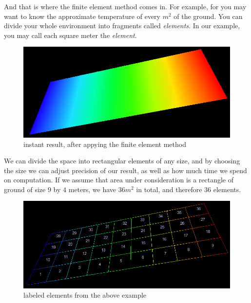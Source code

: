 \documentclass[a4paper,12pt]{article}
\begin{document}
\newpage

And that is where the finite element method comes in. For example, for you may want to know the approximate temperature
of every $m^2$ of the ground. You can divide your whole environment into fragments called \emph{elements}. In our
example, you may call each square meter the \emph{element}. \cite{wiki_finite_element_method}

\begin{figure}[H]
\begin{center}
  \includegraphics[width=\textwidth]{heat_after}
\end{center}
\caption{instant result, after appying the finite element method}
\end{figure}

We can divide the space into rectangular elements of any size, and by choosing the size we can adjust precision of our
result, as well as how much time we spend on computation. If we assume that area under consideration is a rectangle of
ground of size $9$ by $4$ meters, we have $36m^2$ in total, and therefore 36 elements.

\begin{figure}[H]
\begin{center}
  \includegraphics[width=\textwidth]{heat_elements}
\end{center}
\caption{labeled elements from the above example}
\end{figure}
\end{document}
